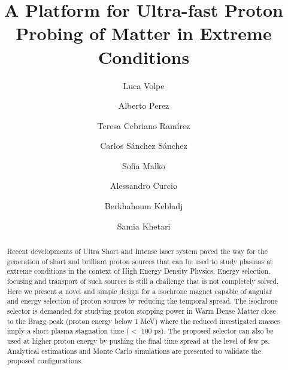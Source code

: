 \documentclass{cup-hpl}
\begin{document}
\newtheorem{theorem}{Theorem}


\title{A Platform for Ultra-fast Proton Probing of Matter in Extreme Conditions}

\author[1,2]{Luca Volpe}
\author[1]{Alberto Perez}
\author[1]{Teresa Cebriano Ramírez}
\author[3]{Carlos Sánchez Sánchez}
\author[4]{Sofia Malko}
\author[1]{Alessandro Curcio}
\author[3]{Berkhahoum Kebladj}
\author[3]{Samia Khetari}

\address[1]{Centro de Laseres Pulsados, Building M5, Science Park, Calle Adaja 8, 37185 Villamayor, Salamanca, Spain}
\address[2]{ETSI Aeronáutica y del Espacio, Universidad Politécnica de Madrid, 28040 Madrid, Spain}
\address[3]{Department of Fundamental Physics, University of Salamanca, 37008 Salamanca, Spain}
\address[4]{Princeton Plasma Physics Laboratory, 100 Stellarator Road, Princeton, NJ 08536, USA.}

\begin{abstract}
Recent developments of Ultra Short and Intense laser system paved the way for the generation of short and brilliant proton sources that can be used to study plasmas at extreme conditions in the context of High Energy Density Physics. Energy selection, focusing and transport of such sources is still a challenge that is not completely solved. Here we present a novel and simple design for a isochrone magnet capable of angular and energy selection of proton sources by reducing the temporal spread. The isochrone selector is demanded for studying proton stopping power in Warm Dense Matter close to the Bragg peak (proton energy below 1 MeV) where the reduced investigated masses imply a short plasma stagnation time ($<$ 100 ps). The proposed selector can also be used at higher proton energy by pushing the final time spread at the level of few ps. Analytical estimations and Monte Carlo simulations are presented to validate the proposed configurations. 
\end{abstract}

\maketitle
\end{document}
